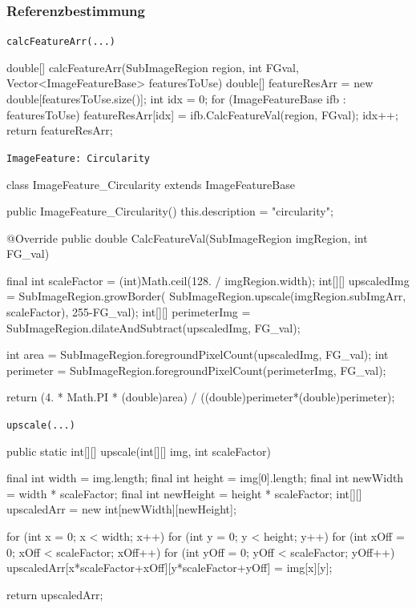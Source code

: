 \documentclass[german,notitlepage,smartquotes]{hgbreport}
\begin{document}
\clearpage

\subsubsection{Referenzbestimmung}

\begin{program}[h]
\caption{\texttt{calcFeatureArr(...)}}
\label{prog:calc-feature-arr}
\begin{JavaCode}
double[] calcFeatureArr(SubImageRegion region, int FGval, Vector<ImageFeatureBase> featuresToUse) {
	double[] featureResArr = new double[featuresToUse.size()];
	int idx = 0;
	for (ImageFeatureBase ifb : featuresToUse) {
		featureResArr[idx] = ifb.CalcFeatureVal(region, FGval);
		idx++;
	}
	return featureResArr;
}
\end{JavaCode}
\end{program}

\begin{program}[h]
\caption{\texttt{ImageFeature: Circularity}}
\label{prog:img-feature-circularity}
\begin{JavaCode}
class ImageFeature_Circularity extends ImageFeatureBase {
	public ImageFeature_Circularity() {
		this.description = "circularity";
	}

	@Override
	public double CalcFeatureVal(SubImageRegion imgRegion, int FG_val) {
		final int scaleFactor = (int)Math.ceil(128. / imgRegion.width);
		int[][] upscaledImg =
				SubImageRegion.growBorder(
						SubImageRegion.upscale(imgRegion.subImgArr, scaleFactor),
						255-FG_val);
		int[][] perimeterImg = SubImageRegion.dilateAndSubtract(upscaledImg, FG_val);

		int area = SubImageRegion.foregroundPixelCount(upscaledImg, FG_val);
		int perimeter = SubImageRegion.foregroundPixelCount(perimeterImg, FG_val);

		return (4. * Math.PI * (double)area) / ((double)perimeter*(double)perimeter);
	}
}
\end{JavaCode}
\end{program}

\begin{program}[h]
\caption{\texttt{upscale(...)}}
\label{prog:upscale}
\begin{JavaCode}
public static int[][] upscale(int[][] img, int scaleFactor) {
	final int width = img.length;
	final int height = img[0].length;
	final int newWidth  = width * scaleFactor;
	final int newHeight = height * scaleFactor;
	int[][] upscaledArr = new int[newWidth][newHeight];

	for (int x = 0; x < width; x++) {
		for (int y = 0; y < height; y++) {
			for (int xOff = 0; xOff < scaleFactor; xOff++) {
				for (int yOff = 0; yOff < scaleFactor; yOff++) {
					upscaledArr[x*scaleFactor+xOff][y*scaleFactor+yOff] = img[x][y];
				}
			}
		}
	}

	return upscaledArr;
}
\end{JavaCode}
\end{program}
\end{document}
